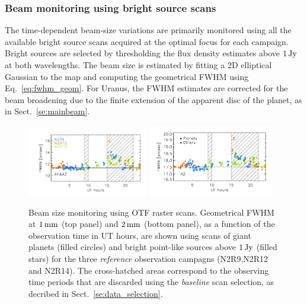 \subsubsection{Beam monitoring using bright source scans}
\label{se:beam_monitoring_otf}

The time-dependent beam-size variations are primarily monitored using
all the available bright source scans acquired at the optimal focus
for each campaign. Bright sources are selected by thresholding the
flux density estimates above $1\,\rm{Jy}$ at both wavelengths.
The beam size is estimated by fitting a 2D elliptical Gaussian to the map {\lp
and computing the geometrical FWHM using Eq.~\ref{eq:fwhm_geom}.}
For Uranus, the FWHM estimates are corrected for the beam broadening due
to the finite extension of the apparent disc of the planet, as in Sect.~\ref{se:mainbeam}. 

\begin{figure}[ht!]
  \begin{center}
    \includegraphics[clip=true, trim={0.9cm, 0.5cm, 0.5cm, 0.5cm}, width=0.4725\textwidth]{Figures/Beam_monitoring_with_otfs_vs_ut_1mm.pdf}
    \includegraphics[clip=true, trim={0.5cm, 0.5cm, 0.5cm, 0.5cm}, width=0.4875\textwidth]{Figures/Beam_monitoring_with_otfs_vs_ut_a2.pdf}
    \caption[Beam size monitoring using OTF scans]{Beam size
      monitoring using OTF raster scans. Geometrical FWHM at $1\,\rm{mm}$ (top panel)
      and $2\,\rm{mm}$ (bottom panel), as a function of the
      observation time in UT hours, are shown using scans of giant
      planets (filled circles) and bright point-like sources above
      $1\,\rm{Jy}$ (filled stars) for the three \emph{reference}
      observation campagns (N2R9,N2R12 and N2R14). The cross-hatched areas
      correspond to the observing time periods that are discarded using
      the \emph{baseline} scan selection, as decribed in Sect.~\ref{se:data_selection}.} 
\label{fig:beam_monitoring_otf}
  \end{center}
\end{figure}

